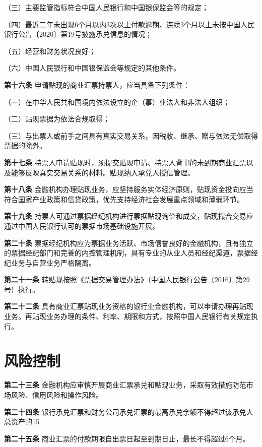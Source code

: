（三）主要监管指标符合中国人民银行和中国银保监会等的规定；

（四）最近二年未出现6个月以内3次以上付款逾期、连续3个月以上未按中国人民银行公告〔2020〕第19号披露承兑信息的情况；

（五）经营和财务状况良好；

（六）中国人民银行和中国银保监会等规定的其他条件。

{\bf 第十六条} 申请贴现的商业汇票持票人，应当具备下列条件：

（一）在中华人民共和国境内依法设立的企（事）业法人和非法人组织；

（二）贴现票据为依法合规取得；

（三）与出票人或前手之间具有真实交易关系，因税收、继承、赠与依法无偿取得票据的除外。

{\bf 第十七条} 持票人申请贴现时，须提交贴现申请、持票人背书的未到期商业汇票以及能够反映真实交易关系的材料。贴现纳入承兑人授信管理。

{\bf 第十八条} 金融机构办理贴现业务，应坚持服务实体经济原则，贴现资金投向应当符合国家产业政策和信贷政策，优先支持经济社会发展重点领域和薄弱环节。

{\bf 第十九条} 持票人可通过票据经纪机构进行票据贴现询价和成交，贴现撮合交易应通过中国人民银行认可的票据市场基础设施开展。

{\bf 第二十条} 票据经纪机构应为票据业务活跃、市场信誉良好的金融机构，且有独立的票据经纪部门和完善的内控管理机制，具有专业的从业人员和经纪渠道，票据经纪业务与自营业务严格隔离。

{\bf 第二十一条} 转贴现按照《票据交易管理办法》（中国人民银行公告〔2016〕第29号）执行。

{\bf 第二十二条} 具有商业汇票贴现业务资格的银行业金融机构，可以申请办理再贴现业务。再贴现业务办理的条件、利率、期限和方式，按照中国人民银行有关规定执行。

\section{风险控制}

{\bf 第二十三条} 金融机构应审慎开展商业汇票承兑和贴现业务，采取有效措施防范市场风险、信用风险和操作风险。

{\bf 第二十四条} 银行承兑汇票和财务公司承兑汇票的最高承兑余额不得超过该承兑人总资产的15%

{\bf 第二十五条} 商业汇票的付款期限自出票日起至到期日止，最长不得超过6个月。

